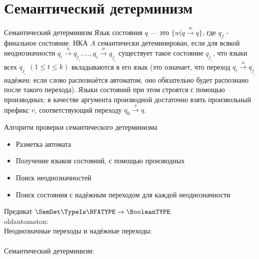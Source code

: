 \section{Семантический детерминизм}
\begin{frame}{Семантический детерминизм}
    \vspace{-5pt}
     Язык состояния $q$ — это $\{w | q \xrightarrow{\text{$w$}} q\}$, где $q_f$  - финальное состояние. НКА $A$ семантически детеминирован, если для всякой неоднозначности $q_i \xrightarrow{\text{$a$}} {q_j__1} , ..., {q_i \xrightarrow{\text{$a$}} q_j__k}$ существует такое состояние $q_j__s$, что языки всех  $q_j__t$ $(1 \leqslant t \leqslant k)$ вкладываются в его язык (это означает, что переход $q_i \xrightarrow{\text{$a$}} {q_j__s}$ надёжен: если слово распознаётся автоматом, оно обязательно будет распознано после такого перехода).
     Языки состояний при этом строятся с помощью производных: в качестве аргумента производной достаточно взять произвольный префикс $v$, соответствующий переходу $q_0 \xrightarrow{\text{$v$}} q$.
\end{frame} %
\begin{frame}{Алгоритм проверки семантического детерминизма}
    \vspace{-5pt}
    \begin{itemize}
        \item Разметка автомата
        \item Получение языков состояний, с помощью производных
        \item Поиск неоднозначностей
        \item Поиск состояния с надёжным переходом для каждой неоднозначности
    \end{itemize}
    
\end{frame}
\begin{frame}{Предикат $\SemDet\TypeIs\NFATYPE\to\BooleanTYPE$}
    \vspace{-5pt}
	\\oldautomaton:
    \\Неоднозначные переходы и надёжные переходы:
    \\%
    \\Семантический детерминизм:
\end{frame}